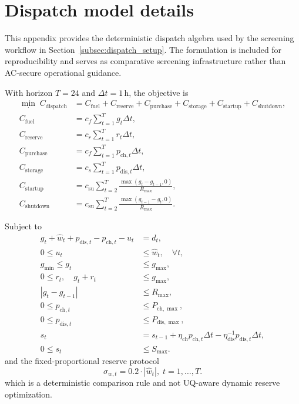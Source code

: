 \documentclass[review,1p,times]{elsarticle}
\begin{document}
\section{Dispatch model details}\label{app:dispatch_details}
This appendix provides the deterministic dispatch algebra used by the screening workflow in Section~\ref{subsec:dispatch_setup}. The formulation is included for reproducibility and serves as comparative screening infrastructure rather than AC-secure operational guidance.

With horizon $T=24$ and $\Delta t=1$\,h, the objective is
\begin{align}
\min_{\cdot}\; C_{\text{dispatch}} &= C_{\text{fuel}} + C_{\text{reserve}} + C_{\text{purchase}} + C_{\text{storage}} + C_{\text{startup}} + C_{\text{shutdown}}, \label{eq:app_dispatch_obj}\\
C_{\text{fuel}} &= c_f\sum_{t=1}^{T} g_t\Delta t, \nonumber\\
C_{\text{reserve}} &= c_r\sum_{t=1}^{T} r_t\Delta t, \nonumber\\
C_{\text{purchase}} &= c_f\sum_{t=1}^{T} p_{\text{ch},t}\Delta t, \nonumber\\
C_{\text{storage}} &= c_s\sum_{t=1}^{T} p_{\text{dis},t}\Delta t, \nonumber\\
C_{\text{startup}} &= c_{\text{su}}\sum_{t=2}^{T}\frac{\max(g_t-g_{t-1},0)}{R_{\max}}, \nonumber\\
C_{\text{shutdown}} &= c_{\text{su}}\sum_{t=2}^{T}\frac{\max(g_{t-1}-g_t,0)}{R_{\max}}. \nonumber
\end{align}

Subject to
\begin{align}
g_t + \hat{w}_t + p_{\text{dis},t} - p_{\text{ch},t} - u_t &= d_t, \label{eq:app_dispatch_balance}\\
0\le u_t &\le \hat{w}_t,\quad \forall t, \nonumber\\
g_{\min}\le g_t &\le g_{\max}, \label{eq:app_dispatch_gen}\\
0\le r_t, \quad g_t+r_t &\le g_{\max}, \nonumber\\
|g_t-g_{t-1}| &\le R_{\max}, \nonumber\\
0\le p_{\text{ch},t} &\le P_{\text{ch},\max}, \label{eq:app_dispatch_storage_power}\\
0\le p_{\text{dis},t} &\le P_{\text{dis},\max}, \nonumber\\
s_t &= s_{t-1} + \eta_{\text{ch}}p_{\text{ch},t}\Delta t - \eta_{\text{dis}}^{-1}p_{\text{dis},t}\Delta t, \label{eq:app_dispatch_storage_soc}\\
0\le s_t &\le S_{\max}. \nonumber
\end{align}
and the fixed-proportional reserve protocol
\begin{equation}
\sigma_{w,t}=0.2\cdot|\hat{w}_t|,\; t=1,\ldots,T.
\end{equation}
which is a deterministic comparison rule and not UQ-aware dynamic reserve optimization.
\end{document}
